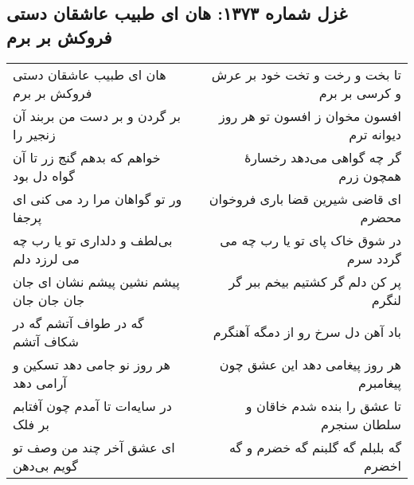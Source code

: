 \begin{center}
\section*{غزل شماره ۱۳۷۳: هان ای طبیب عاشقان دستی فروکش بر برم}
\label{sec:1373}
\begin{longtable}{l p{0.5cm} r}
هان ای طبیب عاشقان دستی فروکش بر برم
&&
تا بخت و رخت و تخت خود بر عرش و کرسی بر برم
\\
بر گردن و بر دست من بربند آن زنجیر را
&&
افسون مخوان ز افسون تو هر روز دیوانه ترم
\\
خواهم که بدهم گنج زر تا آن گواه دل بود
&&
گر چه گواهی می‌دهد رخسارهٔ همچون زرم
\\
ور تو گواهان مرا رد می کنی ای پرجفا
&&
ای قاضی شیرین قضا باری فروخوان محضرم
\\
بی‌لطف و دلداری تو یا رب چه می لرزد دلم
&&
در شوق خاک پای تو یا رب چه می گردد سرم
\\
پیشم نشین پیشم نشان ای جان جان جان جان
&&
پر کن دلم گر کشتیم بیخم ببر گر لنگرم
\\
گه در طواف آتشم گه در شکاف آتشم
&&
باد آهن دل سرخ رو از دمگه آهنگرم
\\
هر روز نو جامی دهد تسکین و آرامی دهد
&&
هر روز پیغامی دهد این عشق چون پیغامبرم
\\
در سایه‌ات تا آمدم چون آفتابم بر فلک
&&
تا عشق را بنده شدم خاقان و سلطان سنجرم
\\
ای عشق آخر چند من وصف تو گویم بی‌دهن
&&
گه بلبلم گه گلبنم گه خضرم و گه اخضرم
\\
\end{longtable}
\end{center}

